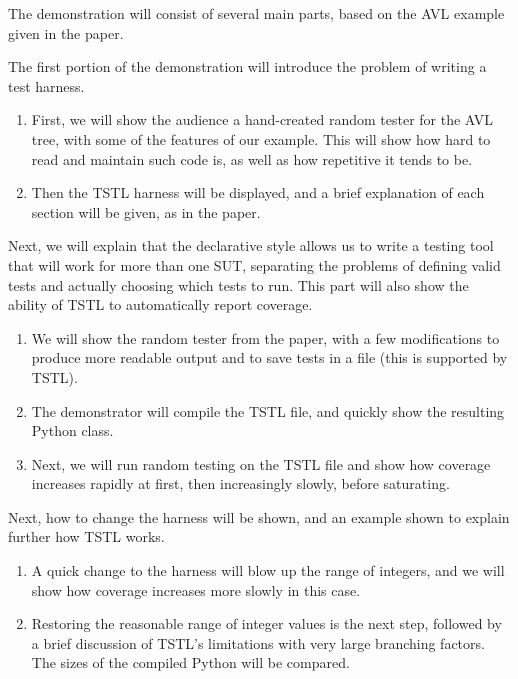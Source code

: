 \documentclass{sig-alternate}
\begin{document}
The demonstration will consist of several main parts, based on the AVL example
given in the paper.

The first portion of the demonstration will introduce the problem of
writing a test harness.

\begin{enumerate}
\item First, we will show the audience a hand-created random tester
  for the AVL tree, with some of the features of our example.  This
  will show how hard to read and maintain such code is, as well as how
  repetitive it tends to be.
\item Then the TSTL harness will be displayed, and a brief explanation
  of each section will be given, as in the paper.
\end{enumerate}

Next, we will explain that the declarative style allows us to write a
testing tool that will work for more than one SUT, separating the
problems of defining valid tests and actually choosing which tests to
run.  This part will also show the ability of TSTL to automatically
report coverage.

\begin{enumerate}
\item We will show the random tester from the paper, with a few
  modifications to produce more readable output and to save tests in a
  file (this is supported by TSTL).
\item The demonstrator will compile the TSTL file, and quickly show
  the resulting Python class.
\item Next, we will run random testing on the TSTL file and show how
  coverage increases rapidly at first, then increasingly slowly,
  before saturating.
\end{enumerate}

Next, how to change the harness will be shown, and an example shown to
explain further how TSTL works.

\begin{enumerate}
\item A quick change to the harness will blow up the range of
  integers, and we will show how coverage increases more slowly in
  this case.  
\item Restoring the reasonable range of integer values is the next
  step, followed by a brief discussion of TSTL's limitations with very
  large branching factors.  The sizes of the compiled Python will be
  compared.
\end{enumerate}
\end{document}
